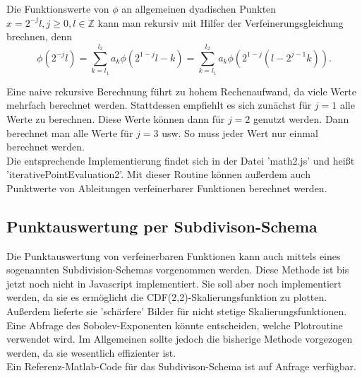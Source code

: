\documentclass[11pt,a4paper,titlepage]{article}
\theoremstyle{plain} %
\theoremstyle{definition} %
\numberwithin{equation}{section} %
\begin{document}
	Die Funktionswerte von $\phi$ an allgemeinen dyadischen Punkten $x=2^{-j}l, j\ge 0, l\in \mathbb{Z}$ kann man rekursiv mit Hilfer der Verfeinerungsgleichung brechnen, denn
	\begin{equation}
		\phi(2^{-j}l)=\sum_{k=l_1} ^{l_2} a_k \phi(2^{1-j}l -k)=\sum_{k=l_1} ^{l_2} a_k \phi(2^{1-j}(l -2^{j-1}k)).
	\end{equation}
	
	Eine naive rekursive Berechnung führt zu hohem Rechenaufwand, da viele Werte mehrfach berechnet werden. Stattdessen empfiehlt es sich zunächst für $j=1$ alle Werte zu berechnen. Diese Werte können dann für $j=2$ genutzt werden. Dann berechnet man alle Werte für $j=3$ usw. So muss jeder Wert nur einmal berechnet werden.\\
	
	Die entsprechende Implementierung findet sich in der Datei 'math2.js' und heißt 'iterativePointEvaluation2'. Mit dieser Routine können außerdem auch Punktwerte von Ableitungen verfeinerbarer Funktionen berechnet werden. 
	
	\subsection{Punktauswertung per Subdivison-Schema}
	
	Die Punktauswertung von verfeinerbaren Funktionen kann auch mittels eines sogenannten Subdivision-Schemas vorgenommen werden. Diese Methode ist bis jetzt noch nicht in Javascript implementiert. Sie soll aber noch implementiert werden, da sie es ermöglicht die CDF(2,2)-Skalierungsfunktion zu plotten. Außerdem lieferte sie 'schärfere' Bilder für nicht stetige Skalierungsfunktionen.\\
	Eine Abfrage des Sobolev-Exponenten könnte entscheiden, welche Plotroutine verwendet wird. Im Allgemeinen sollte jedoch die bisherige Methode vorgezogen werden, da sie wesentlich effizienter ist.\\
	Ein Referenz-Matlab-Code für das Subdivison-Schema ist auf Anfrage verfügbar.
	
	
\end{document}
